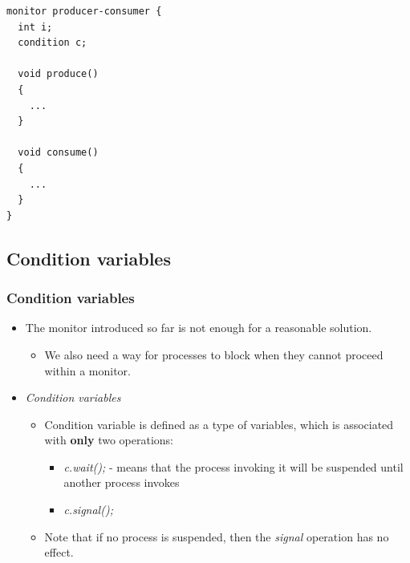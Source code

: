\documentclass[CJKutf8,xcolor=pdftex,dvipsnames,table]{beamer}
\begin{document}
\begin{CJK*}{UTF8}{song}
\begin{frame}[fragile]
\begin{itemize}
\begin{itemize}
\begin{minipage}[c]{0.5\textwidth}
\begin{lstlisting}
monitor producer-consumer {
  int i;
  condition c;

  void produce()
  {
    ...
  }

  void consume()
  {
    ...
  }
}
\end{lstlisting}

      \end{minipage}
    \end{itemize}
  \end{itemize}
\end{frame}

  \subsection{Condition variables}

  \begin{frame}
  \frametitle{Condition variables} \pause
  \begin{itemize}
  \item{The monitor introduced so far is not enough for a reasonable solution.} \pause
    \begin{itemize}
    \item{We also need a way for processes to block when they cannot proceed within a monitor.} \pause
    \end{itemize}
  \item{\emph{Condition variables}} \pause
    \begin{itemize}
    \item{Condition variable is defined as a type of variables, which is
      associated with \textbf{only} two operations:} \pause
      \begin{itemize}
      \item{\emph{c.wait();} \pause - means that the process invoking it will be suspended until another process invokes} \pause
      \item{\emph{c.signal();}} \pause
      \end{itemize}
    \item{Note that if no process is suspended, then the \emph{signal} operation has no effect.}
    \end{itemize}
  \end{itemize}
  \end{frame}


\end{CJK*}
\end{document}
